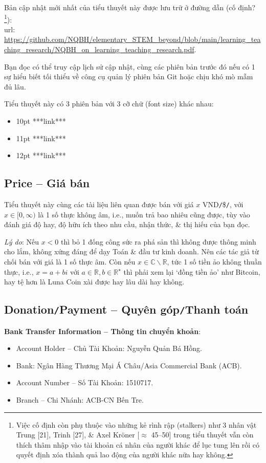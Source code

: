 \documentclass[12pt]{article}
\begin{document}
Bản cập nhật mới nhất của tiểu thuyết này được lưu trữ ở đường dẫn (cố định?\footnote{Việc cố định còn phụ thuộc vào những kẻ rình rập (stalkers) như 3 nhân vật Trung [21], Trinh [27], \& Axel Kr\"oner [$\approx$ 45--50] trong tiểu thuyết vẫn còn thích thâm nhập vào tài khoản cá nhân của người khác để lục tung lên rồi có quyết định xóa thành quả lao động của người khác nữa hay không.}):\\{\sc url}: {\sf\small\url{https://github.com/NQBH/elementary_STEM_beyond/blob/main/learning_teaching_research/NQBH_on_learning_teaching_research.pdf}}.

Bạn đọc có thể truy cập lịch sử cập nhật, cùng các phiên bản trước đó nếu có 1 sự hiểu biết tối thiểu về công cụ quản lý phiên bản Git hoặc chịu khó mò mẫm đủ lâu.

Tiểu thuyết này có 3 phiên bản với 3 cỡ chữ (font size) khác nhau:
\begin{itemize}
	\item 10pt ***link***
	\item 11pt ***link***
	\item 12pt ***link***
\end{itemize}

\subsection{Price -- Giá bán}
Tiểu thuyết này cùng các tài liệu liên quan được bán với giá $x$ VND{\tt/}\${\tt/}\texteuro, với $x\in[0,\infty)$ là 1 số thực không âm, i.e., muốn trả bao nhiêu cũng được, tùy vào đánh giá độ hay, độ hữu ích theo nhu cầu, nhận thức, \& thị hiếu của bạn đọc.

{\it Lý do}: Nếu $x < 0$ thì bỏ 1 đống công sức ra phá sản thì không được thông minh cho lắm, không xứng đáng để dạy Toán \& đầu tư kinh doanh. Nên các tác giả từ chối bán với giá là 1 số thực âm. Còn nếu $x\in\mathbb{C}\backslash\mathbb{R}$, tức 1 số tiền ảo không thuần thực, i.e., $x = a + bi$ với $a\in\mathbb{R},b\in\mathbb{R}^\star$ thì phải xem lại `đồng tiền ảo' như Bitcoin, hay tệ hơn là Luna Coin xài được hay lâu dài hay không.

\subsection{Donation{\tt/}Payment -- Quyên góp{\tt/}Thanh toán}
\noindent\textbf{\textsf{Bank Transfer Information -- Thông tin chuyển khoản}}:
\begin{itemize}
	\item Account Holder -- Chủ Tài Khoản: {\sc Nguyễn Quản Bá Hồng}.
	\item Bank: Ngân Hàng Thương Mại Á Châu/Asia Commercial Bank (ACB).
	\item Account Number -- Số Tài Khoản: 1510717.
	\item Branch -- Chi Nhánh: ACB-CN Bến Tre.
\end{itemize}


\printbibliography[heading=bibintoc]
\label{ref}
	
\end{document}
